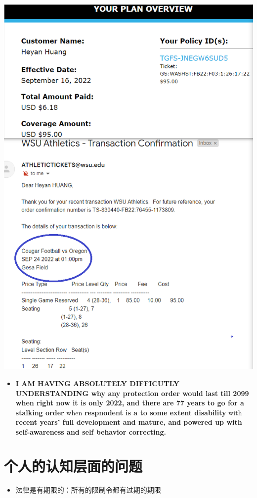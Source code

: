 \documentclass[9pt, b5paper]{article}
\begin{document}
\includegraphics[width=.9\linewidth]{./pic/dearCousin_20220919_221744.png}
\begin{itemize}
\item \textbf{I AM HAVING ABSOLUTELY DIFFICUTLY UNDERSTANDING why any protection order would last till 2099 when right now it is only 2022, and there are 77 years to go for a stalking order} when \textbf{respnodent is a to some extent disability} with \textbf{recent years' full development and mature, and powered up with self-awareness and self behavior correcting.}
\end{itemize}
\section{个人的认知层面的问题　　}
\label{sec-6}
\begin{itemize}
\item 法律是有期限的：所有的限制令都有过期的期限
\end{itemize}
\end{document}

